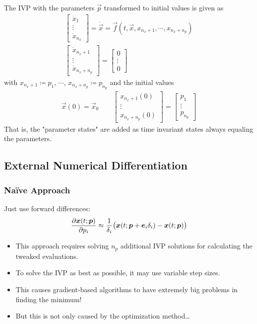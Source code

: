 			The IVP with the parameters \(\vec{p}\) transformed to initial values is given as
			\begin{align*}
				\begin{bmatrix}
					\dot{x}_1 \\
					\vdots \\
					\dot{x}_{n_x}
				\end{bmatrix}
				= \dot{\vec{x}} = \vec{f}(t, \vec{x}, x_{n_x + 1}, \cdots, x_{n_x + n_p}) \\
				\begin{bmatrix}
					\dot{x}_{n_x + 1} \\
					\vdots \\
					\dot{x}_{n_x + n_p}
				\end{bmatrix}
				=
				\begin{bmatrix}
					0 \\
					\vdots \\
					0
				\end{bmatrix}
			\end{align*}
			with \( x_{n_x + 1} \coloneqq p_1 \), \( \cdots \), \( x_{n_x + n_p} \coloneqq p_{n_p} \) and the initial values
			\begin{align*}
				\vec{x}(0) = \vec{x}_0 \qquad
				\begin{bmatrix}
					x_{n_x + 1}(0) \\
					\vdots \\
					x_{n_x + n_p}(0)
				\end{bmatrix}
				=
				\begin{bmatrix}
					p_1 \\
					\vdots \\
					p_{n_p}
				\end{bmatrix}
			\end{align*}
			That is, the "parameter states" are added as time invariant states always equaling the parameters.

		\subsection{External Numerical Differentiation}
			\subsubsection{Na{\"i}ve Approach} %
				Just use forward differences:
				\begin{align*}
					\pdv{\bm{x}(t; \bm{p})}{p_i} \approx \frac{1}{\delta_i} \big( \bm{x}(t; \bm{p} + \bm{e}_i \delta_i) - \bm{x}(t; \bm{p}) \big)
				\end{align*}
				\begin{itemize}
					\item This approach requires solving \(n_p\) additional IVP solutions for calculating the tweaked evaluations.
					\item To solve the IVP as best as possible, it may use variable step sizes.
					\item This causes gradient-based algorithms to have extremely big problems in finding the minimum!
					\item But this is not only caused by the optimization method\dots
				\end{itemize}

